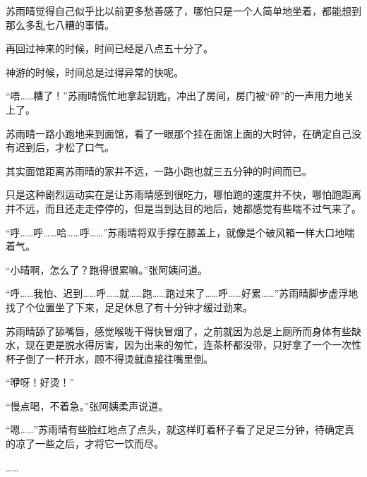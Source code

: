 苏雨晴觉得自己似乎比以前更多愁善感了，哪怕只是一个人简单地坐着，都能想到那么多乱七八糟的事情。

再回过神来的时候，时间已经是八点五十分了。

神游的时候，时间总是过得异常的快呢。

“唔……糟了！”苏雨晴慌忙地拿起钥匙，冲出了房间，房门被“砰”的一声用力地关上了。

苏雨晴一路小跑地来到面馆，看了一眼那个挂在面馆上面的大时钟，在确定自己没有迟到后，才松了口气。

其实面馆距离苏雨晴的家并不远，一路小跑也就三五分钟的时间而已。

只是这种剧烈运动实在是让苏雨晴感到很吃力，哪怕跑的速度并不快，哪怕跑距离并不远，而且还走走停停的，但是当到达目的地后，她都感觉有些喘不过气来了。

“呼……呼……哈……呼……”苏雨晴将双手撑在膝盖上，就像是个破风箱一样大口地喘着气。

“小晴啊，怎么了？跑得很累嘛。”张阿姨问道。

“呼……我怕、迟到……呼……就……跑……跑过来了……呼……好累……”苏雨晴脚步虚浮地找了个位置坐了下来，足足休息了有十分钟才缓过劲来。

苏雨晴舔了舔嘴唇，感觉喉咙干得快冒烟了，之前就因为总是上厕所而身体有些缺水，现在更是脱水得厉害，因为出来的匆忙，连茶杯都没带，只好拿了一个一次性杯子倒了一杯开水，顾不得烫就直接往嘴里倒。

“咿呀！好烫！”

“慢点喝，不着急。”张阿姨柔声说道。

“嗯……”苏雨晴有些脸红地点了点头，就这样盯着杯子看了足足三分钟，待确定真的凉了一些之后，才将它一饮而尽。

……
